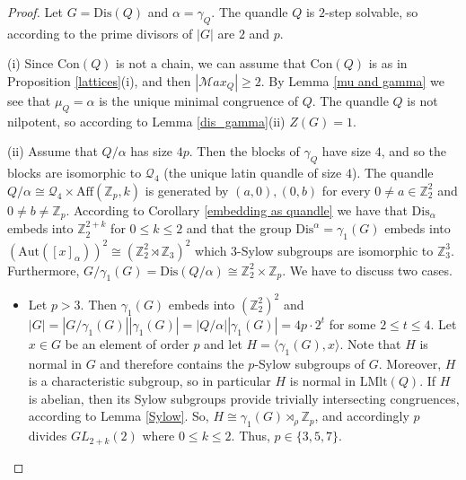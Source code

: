 \documentclass[a4paper, english, 9pt]{amsart}
\theoremstyle{plain}
\theoremstyle{definition}
\def\aut#1{\mathrm{Aut}(#1)}
\def\aff#1{\mathrm{Aff}#1}
\def\lmlt{\mathrm{LMlt}}
\def\dis{\mathrm{Dis}}
\def\con{\mathrm{Con}}
\def\comment#1{{\color{red} #1}}
\def\Z{\mathbb Z}
\def\Ma{\mathcal Max}
\begin{document}
\begin{proof}
Let $G=\dis(Q)$ and $\alpha=\gamma_Q$. The quandle $Q$ is $2$-step solvable, so according to \cite[Corollary 3.14]{Involutory} the prime divisors of $|G|$ are $2$ and $p$. 


(i) Since $\con(Q)$ is not a chain, we can assume that $\con(Q)$ is as in Proposition \ref{lattices}(i), and then $|\Ma_Q|\geq 2$. By Lemma \ref{mu and gamma} we see that $\mu_Q=\alpha$ is the unique minimal congruence of $Q$. The quandle $Q$ is not nilpotent, so according to Lemma \ref{dis_gamma}(ii) $Z(G)=1$.


(ii) Assume that $Q/\alpha$ has size $4p$. Then the blocks of $\gamma_Q$ have size $4$, and so the blocks are isomorphic to $\mathcal{Q}_4$ (the unique latin quandle of size $4$). The quandle $Q/\alpha\cong \mathcal{Q}_4\times \aff(\Z_p,k)$ is generated by $(a,0),(0,b)$ for every $0\neq a\in \Z_2^2$ and $0\neq b\neq \Z_p$. According to Corollary \ref{embedding as quandle} we have that $\dis_{\alpha}$ embeds into $\Z_2^{2+k}$ for $0\leq k\leq 2$ and that the group $\dis^{\alpha}=\gamma_1(G)$ embeds into $(\aut{[x]_{\alpha}})^2\cong (\Z_2^2\rtimes \Z_3)^2$ which $3$-Sylow subgroups are isomorphic to $\Z_3^3$. Furthermore, $G/\gamma_1(G)=\dis(Q/\alpha)\cong \Z_2^2\times \Z_p$. We have to discuss two cases.





%
%

\begin{itemize}
    \item Let $p>3$. Then $\gamma_1(G)$ embeds into $(\Z_2^2)^2$ and $|G|=|G/\gamma_1(G)||\gamma_1(G)|=|Q/\alpha||\gamma_1(G)|=4p\cdot 2^t $ for some $2\leq t\leq 4$. Let $x\in G$ be an element of order $p$ and let $H=\langle \gamma_1(G),x\rangle$. Note that $H$ is normal in $G$ and therefore contains the $p$-Sylow subgroups of $G$. Moreover, $H$ is a characteristic subgroup, so in particular $H$ is normal in $\lmlt(Q)$. If $H$ is abelian, then its Sylow subgroups provide trivially intersecting congruences, according to Lemma \ref{Sylow}. So, $H\cong \gamma_1(G)\rtimes_\rho \Z_p$, and accordingly $p$ divides $GL_{2+k}(2)$ where $0\leq k\leq 2$. Thus, $p\in \{3,5,7\}$.


\end{itemize}
\end{proof}
\end{document}
